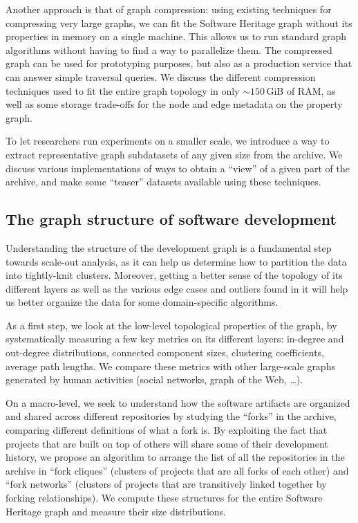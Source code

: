 Another approach is that of graph compression: using existing techniques for
compressing very large graphs, we can fit the Software Heritage graph without
its properties in memory on a single machine. This allows us to run standard
graph algorithms without having to find a way to parallelize them. The
compressed graph can be used for prototyping purposes, but also as a production
service that can answer simple traversal queries. We discuss the different
compression techniques used to fit the entire graph topology in only
$\sim150$\,GiB of RAM, as well as some storage trade-offs for the node and
edge metadata on the property graph.

To let researchers run experiments on a smaller scale, we introduce a way to
extract representative graph subdatasets of any given size from the archive. We
discuss various implementations of ways to obtain a ``view'' of a given part of
the archive, and make some ``teaser'' datasets available using these techniques.

\subsection*{The graph structure of software development}

Understanding the structure of the development graph is a fundamental step
towards scale-out analysis, as it can help us determine how to partition the
data into tightly-knit clusters. Moreover, getting a better sense of the
topology of its different layers as well as the various edge cases and outliers
found in it will help us better organize the data for some domain-specific
algorithms.

As a first step, we look at the low-level topological properties of the graph,
by systematically measuring a few key metrics on its different layers:
in-degree and out-degree distributions, connected component sizes, clustering
coefficients, average path lengths. We compare these metrics with other
large-scale graphs generated by human activities (social networks, graph of the
Web, …).

On a macro-level, we seek to understand how the software artifacts are
organized and shared across different repositories by studying the ``forks'' in
the archive, comparing different definitions of what a fork is. By exploiting
the fact that projects that are built on top of others will share some of their
development history, we propose an algorithm to arrange the list of all the
repositories in the archive in ``fork cliques'' (clusters of projects that are
all forks of each other) and ``fork networks'' (clusters of projects that are
transitively linked together by forking relationships). We compute these
structures for the entire Software Heritage graph and measure their size
distributions.

